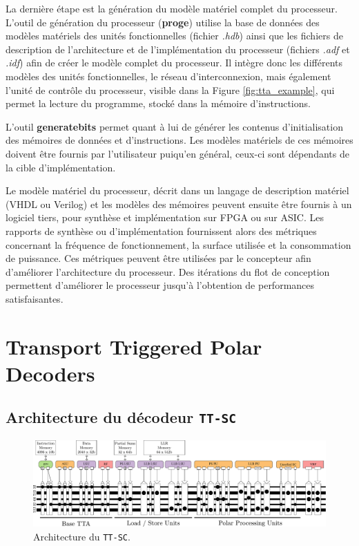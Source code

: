 La dernière étape est la génération du modèle matériel complet du processeur. L'outil de génération du processeur (\textbf{proge}) utilise la base de données des modèles matériels des unités fonctionnelles (fichier \textit{.hdb}) ainsi que les fichiers de description de l'architecture et de l'implémentation du processeur (fichiers \textit{.adf} et \textit{.idf}) afin de créer le modèle complet du processeur. Il intègre donc les différents modèles des unités fonctionnelles, le réseau d'interconnexion, mais également l'unité de contrôle du processeur, visible dans la Figure \ref{fig:tta_example}, qui permet la lecture du programme, stocké dans la mémoire d'instructions.

L'outil \textbf{generatebits} permet quant à lui de générer les contenus d'initialisation des mémoires de données et d'instructions. Les modèles matériels de ces mémoires doivent être fournis par l'utilisateur puiqu'en général, ceux-ci sont dépendants de la cible d'implémentation.

Le modèle matériel du processeur, décrit dans un langage de description matériel (VHDL ou Verilog) et les modèles des mémoires peuvent ensuite être fournis à un logiciel tiers, pour synthèse et implémentation sur FPGA ou sur ASIC. Les rapports de synthèse ou d'implémentation fournissent alors des métriques concernant la fréquence de fonctionnement, la surface utilisée et la consommation de puissance. Ces métriques peuvent être utilisées par le concepteur afin d'améliorer l'architecture du processeur. Des itérations du flot de conception permettent d'améliorer le processeur jusqu'à l'obtention de performances satisfaisantes.



\section{Transport Triggered Polar Decoders}

\subsection{Architecture du décodeur \texttt{TT-SC}}

\begin{figure}[t]
	\centering
	\includegraphics[width=\textwidth]{main/ch4_fig/archi_sc}
	\caption{Architecture du \texttt{TT-SC}.}
	\label{fig:prode}
\end{figure}

